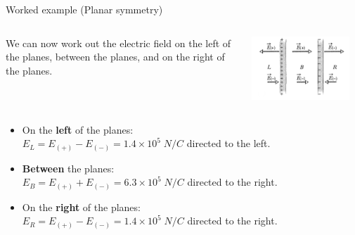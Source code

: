 {\begin{frame}{Worked example (Planar symmetry)}
  \begin{columns}
   \begin{column}{0.50\textwidth}
     We can now work out the electric field on the left of the planes,
     between the planes, and on the right of the planes.
   \end{column}
   \begin{column}{0.50\textwidth}
    \begin{center}
      \includegraphics[width=0.90\textwidth]{./images/problems/lect02_2_charged_planes_solution.png}\\
    \end{center}
   \end{column}
  \end{columns}

     \begin{itemize}
        \item
          On the {\bf left} of the planes:\\
          $E_{L} = E_{(+)} - E_{(-)} = 1.4 \times 10^{5} \; N/C$
          directed to the left.\\
          \vspace{0.2cm}
        \item
          {\bf Between} the planes:\\
          $E_{B} = E_{(+)} + E_{(-)} = 6.3 \times 10^{5} \; N/C$
          directed to the right.\\
          \vspace{0.2cm}
        \item
          On the {\bf right} of the planes:\\
          $E_{R} = E_{(+)} - E_{(-)} = 1.4 \times 10^{5} \; N/C$
          directed to the right.\\
      \end{itemize}


\end{frame}}
